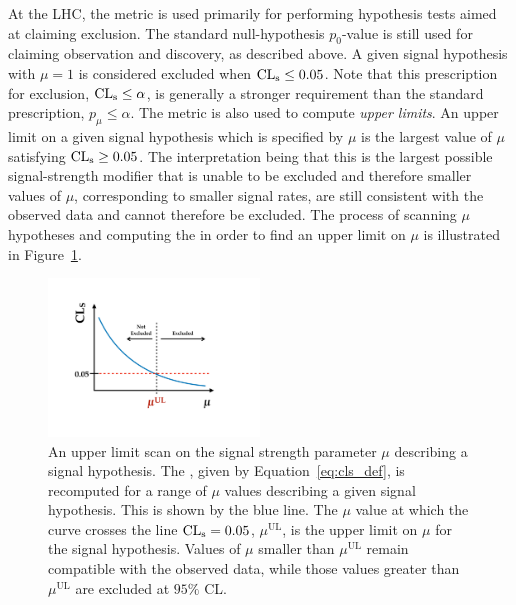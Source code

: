 At the LHC, the \cls metric is used primarily for performing hypothesis tests aimed at claiming exclusion.
The standard null-hypothesis $p_0$-value is still used for claiming observation and discovery, as described above.
A given signal hypothesis with $\mu = 1$ is considered excluded when $\text{CL}_{\text{s}} \le 0.05$.
Note that this prescription for exclusion, $\text{CL}_{\text{s}} \le \alpha$, is generally a stronger requirement than the
standard prescription, $p_{\mu} \le \alpha$.
The \cls metric is also used to compute \textit{upper limits}.
An upper limit on a given signal hypothesis which is specified by $\mu$
is the largest value of $\mu$ satisfying $\text{CL}_{\text{s}} \ge 0.05$.
The interpretation being that this is the largest possible signal-strength modifier
that is unable to be excluded and therefore smaller values of $\mu$, corresponding
to smaller signal rates, are still consistent with the observed data and cannot therefore
be excluded.
The process of scanning $\mu$ hypotheses and computing the \cls in order to find
an upper limit on $\mu$ is illustrated in Figure~\ref{fig:upper_limit_scan_cartoon}.

\begin{figure}[!htb]
    \begin{center}
        \includegraphics[width=0.5\textwidth]{figures/common_ana/stat_hypo/upper_limit_scan_examplePDF}
        \caption{
            An upper limit scan on the signal strength parameter $\mu$ describing a signal hypothesis.
            The \cls, given by Equation~\ref{eq:cls_def}, is recomputed for a range of $\mu$ values
            describing a given signal hypothesis.
            This is shown by the blue line.
            The $\mu$ value at which the \cls curve crosses the line $\text{CL}_{\text{s}} = 0.05$, $\mu^{\text{UL}}$, is the
            upper limit on $\mu$ for the signal hypothesis.
            Values of $\mu$ smaller than $\mu^{\text{UL}}$ remain compatible with the observed data,
            while those values greater than $\mu^{\text{UL}}$ are excluded at $95\%$ CL.
        }
        \label{fig:upper_limit_scan_cartoon}
    \end{center}
\end{figure}

